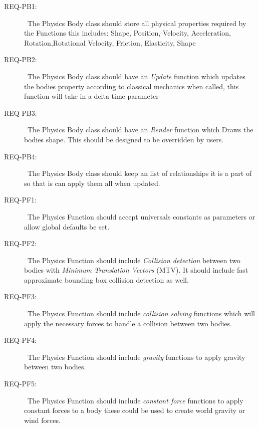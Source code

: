 \documentclass{scrreprt}
\begin{document}
\begin{description}
\item [{REQ-PB1:}]~The Physics Body class should store all physical properties required by the Functions this includes: Shape, Position, Velocity, Acceleration, Rotation,Rotational Velocity, Friction, Elasticity, Shape
\item [{REQ-PB2:}]~The Physics Body class should have an \textit{Update} function which updates the bodies property according to classical mechanics when called,  this function will take in a delta time parameter 
\item [{REQ-PB3:}]~The Physics Body class should have an \textit{Render} function which Draws the bodies shape.  This should be designed to be overridden by users.
\item [{REQ-PB4:}]~The Physics Body class should keep an list of relationships it is a part of so that is can apply them all when updated.

\item [{REQ-PF1:}]~The Physics Function should accept universals constants as parameters or allow global defaults be set.
\item [{REQ-PF2:}]~The Physics Function should include \textit{Collision detection} between two bodies with \textit{Minimum Translation Vectors} (MTV).  It should include fast approximate bounding box collision detection as well.
\item [{REQ-PF3:}]~The Physics Function should include \textit{collision solving} functions which will apply the necessary forces to handle a collision between two bodies.
\item [{REQ-PF4:}]~The Physics Function should include \textit{gravity} functions to apply gravity between two bodies.
\item [{REQ-PF5:}]~The Physics Function should include \textit{constant force} functions to apply constant forces to a body these could be used to create world gravity or wind forces.


\end{description}
\end{document}
